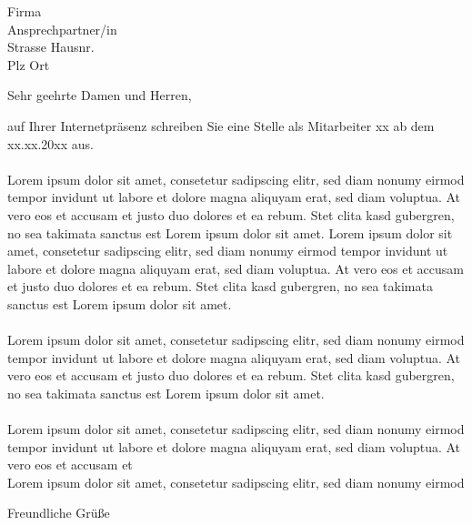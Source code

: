 \documentclass[firstfoot=false]{scrlttr2}
\begin{document}
\begin{letter}{Firma \\ Ansprechpartner/in \\ Strasse Hausnr. \\ Plz Ort}

\opening{Sehr geehrte Damen und Herren,}
auf Ihrer Internetpräsenz schreiben Sie eine Stelle als Mitarbeiter xx ab dem xx.xx.20xx aus.\\\\
Lorem ipsum dolor sit amet, consetetur sadipscing elitr, sed diam nonumy eirmod tempor invidunt ut labore et dolore magna aliquyam erat, sed diam voluptua. At vero eos et accusam et justo duo dolores et ea rebum. Stet clita kasd gubergren, no sea takimata sanctus est Lorem ipsum dolor sit amet. Lorem ipsum dolor sit amet, consetetur sadipscing elitr, sed diam nonumy eirmod tempor invidunt ut labore et dolore magna aliquyam erat, sed diam voluptua. At vero eos et accusam et justo duo dolores et ea rebum. Stet clita kasd gubergren, no sea takimata sanctus est Lorem ipsum dolor sit amet.\\\\
Lorem ipsum dolor sit amet, consetetur sadipscing elitr, sed diam nonumy eirmod tempor invidunt ut labore et dolore magna aliquyam erat, sed diam voluptua. At vero eos et accusam et justo duo dolores et ea rebum. Stet clita kasd gubergren, no sea takimata sanctus est Lorem ipsum dolor sit amet.\\\\
Lorem ipsum dolor sit amet, consetetur sadipscing elitr, sed diam nonumy eirmod tempor invidunt ut labore et dolore magna aliquyam erat, sed diam voluptua. At vero eos et accusam et\\
Lorem ipsum dolor sit amet, consetetur sadipscing elitr, sed diam nonumy eirmod
\closing{Freundliche Grüße}
\end{letter}
\end{document}
